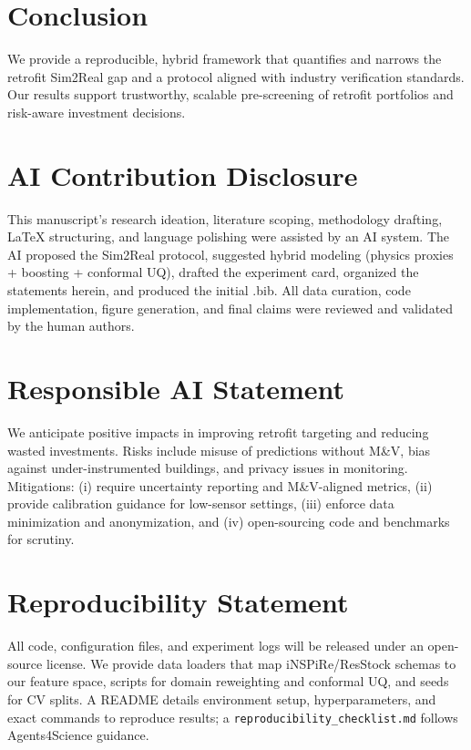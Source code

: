 \documentclass{article}
\begin{document}
\section{Conclusion}
We provide a reproducible, hybrid framework that quantifies and narrows the retrofit Sim2Real gap and a protocol aligned with industry verification standards. Our results support trustworthy, scalable pre-screening of retrofit portfolios and risk-aware investment decisions.

\section*{AI Contribution Disclosure}
This manuscript's research ideation, literature scoping, methodology drafting, LaTeX structuring, and language polishing were assisted by an AI system. The AI proposed the Sim2Real protocol, suggested hybrid modeling (physics proxies + boosting + conformal UQ), drafted the experiment card, organized the statements herein, and produced the initial .bib. All data curation, code implementation, figure generation, and final claims were reviewed and validated by the human authors.

\section*{Responsible AI Statement}
We anticipate positive impacts in improving retrofit targeting and reducing wasted investments. Risks include misuse of predictions without M\&V, bias against under-instrumented buildings, and privacy issues in monitoring. Mitigations: (i) require uncertainty reporting and M\&V-aligned metrics, (ii) provide calibration guidance for low-sensor settings, (iii) enforce data minimization and anonymization, and (iv) open-sourcing code and benchmarks for scrutiny.

\section*{Reproducibility Statement}
All code, configuration files, and experiment logs will be released under an open-source license. We provide data loaders that map iNSPiRe/ResStock schemas to our feature space, scripts for domain reweighting and conformal UQ, and seeds for CV splits. A README details environment setup, hyperparameters, and exact commands to reproduce results; a \texttt{reproducibility\_checklist.md} follows Agents4Science guidance.



\end{document}
